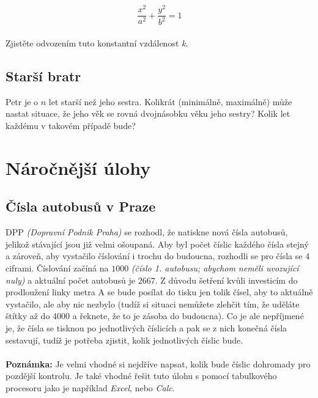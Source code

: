 \documentclass[a4paper,12pt]{article}
\begin{document}
\begin{equation*}
  \frac{x^2}{a^2} + \frac{y^2}{b^2} = 1
\end{equation*}
\\
Zjistěte odvozením tuto konstantní vzdálenost \textit{k}.
 
\subsection{Starší bratr}

Petr je o $n$ let starší než jeho sestra. Kolikrát (minimálně, maximálně) může nastat situace, že jeho věk se rovná dvojnásobku věku jeho sestry? Kolik let každému v takovém případě bude?

\section{Náročnější úlohy}

\subsection{Čísla autobusů v Praze}

DPP \textit{(Dopravní Podnik Praha)} se rozhodl, že natiskne nová čísla autobusů, jelikož stávající jsou již velmi ošoupaná. Aby byl počet číslic každého čísla stejný a zároveň, aby vystačilo číslování i trochu do budoucna, rozhodli se pro čísla se 4 ciframi. Číslování začíná na $1000$ \textit{(číslo 1. autobusu; abychom neměli uvozující nuly)} a aktuální počet autobusů je $2667$. Z důvodu šetření kvůli investicím do prodloužení linky metra A se bude posílat do tisku jen tolik čísel, aby to aktuálně vystačilo, ale aby nic nezbylo (tudíž si situaci nemůžete zlehčit tím, že uděláte štítky až do 4000 a řeknete, že to je zásoba do budoucna). Co je ale nepříjmené je, že čísla se tisknou po jednotlivých číslicích a pak se z nich konečná čísla sestavují, tudíž je potřeba zjistit, kolik jednotlivých číslic bude.
\\ \\
\textbf{Poznámka:} Je velmi vhodné si nejdříve napsat, kolik bude číslic dohromady pro pozdější kontrolu. Je také vhodné řešit tuto úlohu s pomocí tabulkového procesoru jako je například \textit{Excel}, nebo \textit{Calc}.
\end{document}
